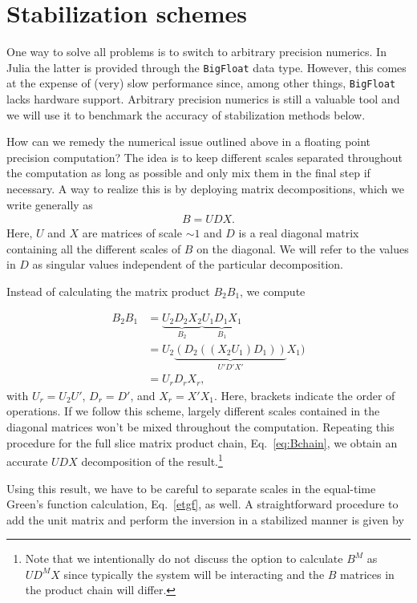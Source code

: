 \documentclass[%
 reprint,
superscriptaddress,
showpacs,
 amsmath,amssymb,
 aps,
 prb,
longbibliography,
]{revtex4-1}
\begin{document}
\section{\label{sec:stabilization}Stabilization schemes}

One way to solve all problems is to switch to arbitrary precision numerics. In Julia the latter is provided through the \texttt{BigFloat} data type. However, this comes at the expense of (very) slow performance since, among other things, \texttt{BigFloat} lacks hardware support. Arbitrary precision numerics is still a valuable tool and we will use it to benchmark the accuracy of stabilization methods below.

How can we remedy the numerical issue outlined above in a floating point precision computation? The idea is to keep different scales separated throughout the computation as long as possible and only mix them in the final step if necessary. A way to realize this is by deploying matrix decompositions, which we write generally as
\begin{align}
	B = UDX.
\end{align}
Here, $U$ and $X$ are matrices of scale $\sim 1$ and $D$ is a real diagonal matrix containing all the different scales of $B$ on the diagonal. We will refer to the values in $D$ as singular values independent of the particular decomposition.

Instead of calculating the matrix product $B_2 B_1$, we compute

\begin{align}
B_2 B_1 &= \underbrace{U_2 D_2 X_2}_{B_2}\underbrace{U_1 D_1 X_1}_{B_1} \nonumber\\
&= U_2 \underbrace{(D_2 ((X_2 U_1) D_1))}_{U' D' X'} X_1)\\
&= U_r D_r X_r, \nonumber
\end{align}
with $U_r = U_2 U'$, $D_r = D'$, and $X_r = X' X_1$. Here, brackets indicate the order of operations. If we follow this scheme, largely different scales contained in the diagonal matrices won't be mixed throughout the computation. Repeating this procedure for the full slice matrix product chain, Eq.~\eqref{eq:Bchain}, we obtain an accurate $UDX$ decomposition of the result.\footnote{Note that we intentionally do not discuss the option to calculate $B^M$ as $U D^M X$ since typically the system will be interacting and the $B$ matrices in the product chain will differ.}

Using this result, we have to be careful to separate scales in the equal-time Green's function calculation, Eq.~\ref{etgf}, as well. A straightforward procedure to add the unit matrix and perform the inversion in a stabilized manner is given by
\end{document}
